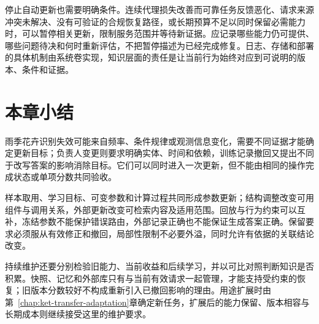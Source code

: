 停止自动更新也需要明确条件。连续代理损失改善而可靠任务反馈恶化、请求来源冲突未解决、没有可验证的合规恢复路径，或长期预算不足以同时保留必需能力时，可以暂停相关更新，限制服务范围并等待新证据。应记录哪些能力仍可提供、哪些问题待决和何时重新评估，不把暂停描述为已经完成修复。日志、存储和部署的具体机制由系统卷实现，知识层面的责任是让当前行为始终对应到可说明的版本、条件和证据。

\FloatBarrier
\section{本章小结}
\label{sec:ket-update-summary}

雨季花卉识别失效可能来自频率、条件规律或观测信息变化，需要不同证据才能确定更新目标；负责人变更则要求明确实体、时间和依赖，训练记录撤回又提出不同于改写答案的影响消除目标。它们可以同时进入一次更新，但不能由相同的操作完成状态或单项分数共同验收。

样本取用、学习目标、可变参数和计算过程共同形成参数更新；结构调整改变可用组件与调用关系，外部更新改变可检索内容及适用范围。回放与行为约束可以互补，冻结参数不能保护错误路由，外部记录正确也不能保证生成答案正确。保留要求必须服从有效修正和撤回，局部性限制不必要外溢，同时允许有依据的关联结论改变。

持续维护还要分别检验旧能力、当前收益和后续学习，并以可比对照判断知识是否积累。快照、记忆和外部库只有与当前有效请求一起管理，才能支持受约束的恢复；旧版本分数较好不构成重新引入已撤回影响的理由。用途扩展时由第~\ref{chap:ket-transfer-adaptation}章确定新任务，扩展后的能力保留、版本相容与长期成本则继续接受这里的维护要求。
